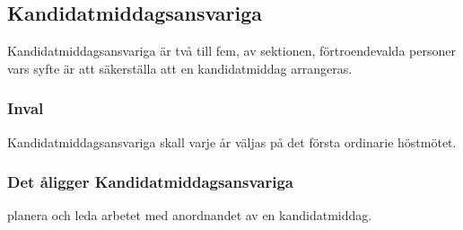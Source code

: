 \subsection{Kandidatmiddagsansvariga}
Kandidatmiddagsansvariga är två till fem, av sektionen, förtroendevalda personer vars syfte är att säkerställa att en kandidatmiddag arrangeras.

\subsubsection{Inval}
Kandidatmiddagsansvariga skall varje år väljas på det första ordinarie höstmötet.

\subsubsection{Det åligger Kandidatmiddagsansvariga}
\begin{att}
  \item planera och leda arbetet med anordnandet av en kandidatmiddag.
\end{att}
